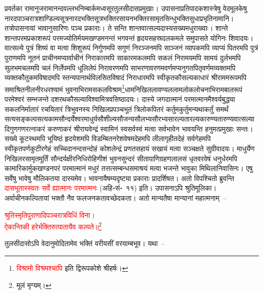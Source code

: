 \begin{sloppypar}
प्रवर्तका रामानुज\-रामानन्द\-वल्लभ\-निम्बार्क\-मध्व\-सूर\-तुलसीदास\-प्रमुखाः। उपासना\-प्रतिपादक\-शास्त्रेषु वेद\-मूलकेषु नारद\-पाञ्चरात्र\-शाण्डिल्य\-सूत्र\-नारद\-भक्ति\-सूत्र\-भक्ति\-रसायन\-भक्ति\-रसामृत\-सिन्धु\-भक्तिसुधा\-प्रभृति\-नामानि। तत्रोपासनायां भावानुसारिणः पञ्च प्रकाराः। ते सन्ति शान्त\-वात्सल्य\-दास्य\-सख्य\-मधुराख्याः। शान्ते शान्त\-परम\-प्रकाश\-रूपं परम\-ज्योतिर्मयमखण्डमनन्तं भगवन्तं हृदय\-सहस्रदल\-कमले समुपासते योगिनः शिवादयः। वात्सल्ये पुत्रं शिष्यं वा मत्वा शिशु\-रूपं निर्गुणमपि सगुणं निरञ्जनमपि साञ्जनं व्यापकमपि व्याप्यं पितरमपि पुत्रं पुराणमपि नूतनं प्राचीनमप्यार्वाचीनं निराकारमपि साकारमकलमपि सकलं निरामयमपि सामयं दुर्लभमपि सुलभमचलमपि चलं निर्लेपमपि धूलिलेपं निरावरणमपि साभरणावरणमवर्णमप्यनुगत\-पितृवर्णमव्यक्तमपि व्यक्त\-कौतुकमविषादमपि स्तन्यपानार्थ\-विलसित\-विषादं निराधारमपि स्वीकृतकौसल्यकाधारं श्रीराममरूपमपि समाश्रित\-नीलनीरधरश्यामं भुवनाभिराम\-सकल\-विश्राम\footnote{\textcolor{red}{विश्रामो विश्रमश्चापि} इति द्विरूपकोशे श्रीहर्षः।}\-धाम\-निखिल\-लावण्य\-ललाम\-लोक\-लोचनाभिराम\-बालरूपं परमेश्वरं सम्भजन्ते दशरथ\-कौसल्या\-विश्वामित्र\-वसिष्ठादयः। दास्ये जगदात्मानं परमात्मानमैश्वर्य\-बुद्ध्या सकल\-निर्मातारं रचयितारं त्रिभुवनस्य निखिल\-प्रपञ्च\-भूतं त्रिलोकपितरं कर्तुमकुर्तुमन्यथाकर्तुं समर्थं सत्य\-सङ्कल्प\-सत्य\-काम\-सौन्दर्येश्वर\-माधुर्य\-सौशील्य\-सौजन्य\-सौलभ्य\-सौरभ्य\-सारल्य\-तारल्य\-कारुण्य\-तारुण्य\-वात्सल्यादि\-गुण\-गण\-रत्नाकरं करुणाकरं श्री\-राघवेन्द्रं स्वामिनं स्व\-सर्वस्वं मत्वा सर्व\-भावेन भावयन्ति हनुमत्प्रमुखाः सन्तः। सख्ये कूटस्थमपि भूयिष्ठं हृदयेशमपि विडम्बित\-नरेश\-वेषमदेहमपि लीलागृहीत\-देहं सर्व\-गेह\-मपि स्वीकृत\-पर्णकुटीर\-गेहं सच्चिदानन्द\-सन्दोहं कोशलेन्द्रं प्रणत\-सहायं सखायं मत्वा सञ्चक्षते सुग्रीवादयः। माधुर्येण निखिल\-रसामृत\-मूर्तिं सौन्दर्य\-क्षीरनिधि\-रोहिणीशं भुवन\-सुन्दरं सीता\-पाणिग्रहण\-लालसं धृत\-वर\-वेषं धनुर्धरमपि कामारि\-कार्मुक\-खण्डन\-परं परमात्मानं मधुरं तत्तत्सम्बन्ध\-समाश्रयं मत्वा भजन्ते भावुका मिथिला\-निवासिनः। एषु सर्वेषु भावेषु मौलिकतया दास्यमेव। भावनावैषम्यदृष्ट्या प्रकाराः प्रादर्शिषत। अतो विपश्चितो ब्रुवन्ति \textcolor{red}{दासभूतास्स्वतः सर्वे ह्यात्मानः परमात्मनः} (अहि॰सं॰~११) इति। उपासनाऽपि श्रुतिमूलिका। अर्वाचीन\-कल्पितायां भक्तौ नैव फलजनकतावच्छेदकता। अतो मान्यतैषा मान्यानां महात्मनाम्~–\end{sloppypar}
\centering\textcolor{red}{श्रुतिस्मृतिपुराणादिपञ्चरात्रविधिं विना। \nopagebreak\\
ऐकान्तिकी हरेर्भक्तिरुत्पातायैव कल्पते॥}\footnote{मूलं मृग्यम्।}\\
\begin{sloppypar}\justifying\noindent\hspace{10mm} तुलसीदासोऽपि वेदानुमोदितामेव भक्तिं वरीयसीं वरयाम्बभूव। यथा~–\end{sloppypar}

